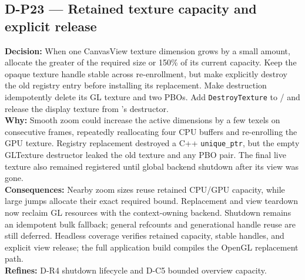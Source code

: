 \subsection*{D-P23 --- Retained texture capacity and explicit release}
\begin{decisionbox}[title={D-P23 \quad 2026-08-09}]
\textbf{Decision:} When one CanvasView texture dimension grows by a small
amount, allocate the greater of the required size or 150\% of its current
capacity. Keep the opaque texture handle stable across re-enrollment, but make
 explicitly destroy the old registry entry before
installing its replacement. Make  destruction idempotently
delete its GL texture and two PBOs. Add \texttt{DestroyTexture} to
/ and release the display texture from
's destructor.\\
\textbf{Why:} Smooth zoom could increase the active dimensions by a few texels
on consecutive frames, repeatedly reallocating four CPU buffers and
re-enrolling the GPU texture. Registry replacement destroyed a C++
\texttt{unique\_ptr}, but the empty GLTexture destructor leaked the old texture
and any PBO pair. The final live texture also remained registered until global
backend shutdown after its view was gone.\\
\textbf{Consequences:} Nearby zoom sizes reuse retained CPU/GPU capacity, while
large jumps allocate their exact required bound. Replacement and view teardown
now reclaim GL resources with the context-owning backend. Shutdown remains an
idempotent bulk fallback; general refcounts and generational handle reuse are
still deferred. Headless coverage verifies retained capacity, stable handles,
and explicit view release; the full application build compiles the OpenGL
replacement path.\\
\textbf{Refines:} D-R4 shutdown lifecycle and D-C5 bounded overview capacity.
\end{decisionbox}

